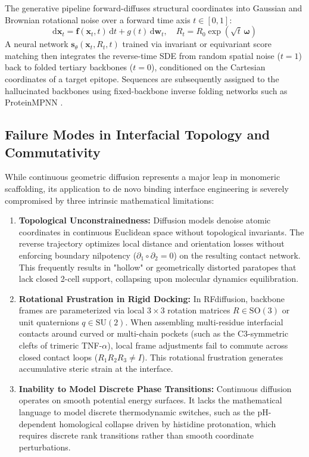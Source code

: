 The generative pipeline forward-diffuses structural coordinates into Gaussian and Brownian rotational noise over a forward time axis $t \in [0, 1]$:
\begin{equation}
    \mathrm{d}\mathbf{x}_t = \mathbf{f}(\mathbf{x}_t, t)\,\mathrm{d}t + g(t)\,\mathrm{d}\mathbf{w}_t, \quad R_t = R_0 \exp\left( \sqrt{t} \, \boldsymbol{\omega} \right)
\end{equation}
A neural network $\mathbf{s}_\theta(\mathbf{x}_t, R_t, t)$ trained via invariant or equivariant score matching then integrates the reverse-time SDE from random spatial noise ($t = 1$) back to folded tertiary backbones ($t = 0$), conditioned on the Cartesian coordinates of a target epitope. Sequences are subsequently assigned to the hallucinated backbones using fixed-backbone inverse folding networks such as ProteinMPNN \cite{dauparas2022robust}.

\subsection{Failure Modes in Interfacial Topology and Commutativity}
While continuous geometric diffusion represents a major leap in monomeric scaffolding, its application to de novo binding interface engineering is severely compromised by three intrinsic mathematical limitations:
\begin{enumerate}[leftmargin=1.2cm]
    \item \textbf{Topological Unconstrainedness:} Diffusion models denoise atomic coordinates in continuous Euclidean space without topological invariants. The reverse trajectory optimizes local distance and orientation losses without enforcing boundary nilpotency ($\partial_1 \circ \partial_2 = 0$) on the resulting contact network. This frequently results in "hollow" or geometrically distorted paratopes that lack closed 2-cell support, collapsing upon molecular dynamics equilibration.
    \item \textbf{Rotational Frustration in Rigid Docking:} In RFdiffusion, backbone frames are parameterized via local $3 \times 3$ rotation matrices $R \in \mathrm{SO}(3)$ or unit quaternions $q \in \mathrm{SU}(2)$. When assembling multi-residue interfacial contacts around curved or multi-chain pockets (such as the C3-symmetric clefts of trimeric TNF-$\alpha$), local frame adjustments fail to commute across closed contact loops ($R_1 R_2 R_3 \ne I$). This rotational frustration generates accumulative steric strain at the interface.
    \item \textbf{Inability to Model Discrete Phase Transitions:} Continuous diffusion operates on smooth potential energy surfaces. It lacks the mathematical language to model discrete thermodynamic switches, such as the pH-dependent homological collapse driven by histidine protonation, which requires discrete rank transitions rather than smooth coordinate perturbations.
\end{enumerate}


